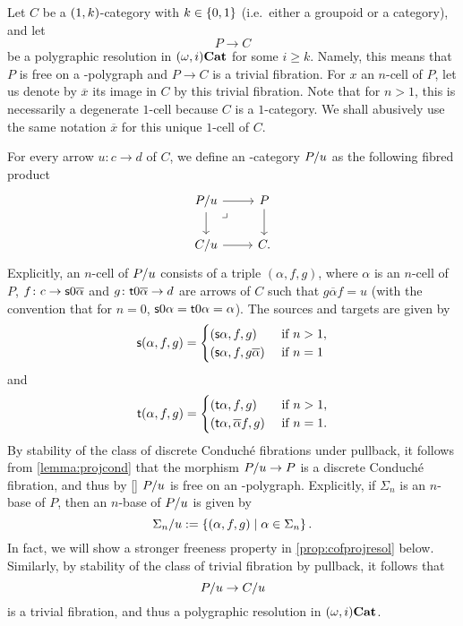 \documentclass{amsart}
\newcommand{\src}[1]{\source{} #1}
\newcommand{\tgt}[1]{\target{} #1}
\renewcommand{\sce}[1]{\source{} #1}
\renewcommand{\tge}[1]{\target{} #1}
\begin{document}
  \begin{paragr}\label{paragr:slicepol}
    Let $C$ be a $(1,k)$\nbd-category with $k \in \left\{0,1\right\}$
    (i.e.\ either a groupoid or a category), and let
    \[
       P \to C
    \]
    be a polygraphic resolution in $(\omega,i)\mathbf{Cat}$ for some $i \geq
    k$. Namely, this means that $P$ is free on a -polygraph and
    $P\to C$ is a trivial fibration. For $x$ an $n$\nbd-cell of $P$,
    let us denote by $\overline{x}$ its image in $C$ by this trivial
    fibration. Note that for $n>1$, this is necessarily a degenerate
    $1$\nbd-cell because $C$ is a $1$\nbd-category. We shall abusively
    use the
    same notation $\overline{x}$ for this unique $1$\nbd-cell of $C$.
  \end{paragr}
  \begin{paragr}
    For every arrow $u\colon c \to d$ of $C$, we define an
    \nbd-category $P/u$ as the following fibred product
    \[
      \begin{tikzcd}
        \tr{P}{u} \ar[r] \ar[d] & P \ar[d] \\
        \tr{C}{u} \ar[r] & C.
        \ar[from=1-1,to=2-2,phantom,"\lrcorner" very near start]
      \end{tikzcd}
    \]
    Explicitly, an $n$\nbd-cell of $P/u$ consists of a
      triple $(\alpha,f,g)$, where $\alpha$ is an $n$\nbd-cell of $P$,
      $f \colon c \to \src{0}\overline{\alpha}$ and $g \colon
      \tgt{0}\overline{\alpha}\to d$ are arrows of $C$ such that
      $g\overline{\alpha}f=u$ (with the convention that for $n=0$,
      $\src{0}\alpha=\tgt{0}\alpha=\alpha$). The sources
      and targets are given by
      \[
        \sce{(\alpha,f,g)}=\begin{cases}
          (\sce{}\alpha,f,g)& \text{ if } n>1, \\
          (\sce{}\alpha,f,g\overline{\alpha})& \text{ if } n=1
          \end{cases}
        \]
        and
        \[
          \tge{(\alpha,f,g)}=\begin{cases}
          (\tge{}\alpha,f,g)& \text{ if } n>1, \\
          (\tge{}\alpha,\overline{\alpha}f,g)& \text{ if } n=1.
          \end{cases}
        \]
    By stability of the class of discrete Conduché fibrations under
    pullback, it follows from \cref{lemma:projcond} that the morphism
    $P/u\to P$ is a discrete Conduché fibration, and thus by
    \ref{} $P/u$ is free on an
    \nbd-polygraph. Explicitly, if $\Sigma_n$ is an
    $n$\nbd-base of $P$, then an $n$\nbd-base of $P/u$ is given
    by
    \[
      \Sigma_n/u:=\left\{ (\alpha,f,g)\; | \; \alpha \in \Sigma_n\right\}.
    \]
    In fact,
    we will show a stronger freeness property in
    \cref{prop:cofprojresol} below. Similarly, by
    stability of the class of trivial fibration by pullback, it
    follows that \[P/u \to C/u\] is a trivial fibration,
    and thus a polygraphic resolution in $(\omega,i)\mathbf{Cat}$.
  \end{paragr}
\end{document}
